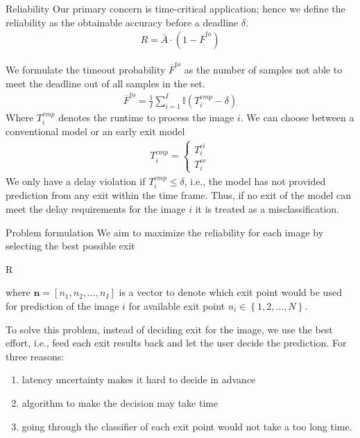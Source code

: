\begin{enumdescript}
\begin{enumdescript}
	\end{enumdescript}
	
	\item[Reliability] Our primary concern is time-critical application; hence we define the reliability as the obtainable accuracy before a deadline $ \delta $. 	
	\begin{align}
	R= \bar{A} \cdot (1-\overline{F}^{to})
	\end{align}
	
	We formulate the timeout probability $ \overline{F}^{to} $ as the number of samples not able to meet the deadline out of all samples in the set.
	\begin{align}
	\overline{F}^{to}=\frac{1}{I}\sum_{i=1}^{I} \mathbb{I}\left(T_{i}^{cmp}-\delta\right)
	\end{align}
	Where $ T_{i}^{cmp} $ denotes the runtime to process the image $i$. We can choose between a conventional model or an early exit model 
	\begin{align}
	T^{cmp}_i = \begin{cases}
	T^{ci}_i \\
	T^{ee}_i
	\end{cases} \label{eq:t_ci-and-t_ee}
	\end{align}
	We only have a delay violation if $ T_i^{cmp} \leq \delta $, i.e., the model has not provided prediction from any exit within the time frame. Thus, if no exit of the model can meet the delay requirements for the image $i$ it is treated as a misclassification. 
	
	\item[Problem formulation] We aim to maximize the reliability for each image by selecting the best possible exit
	\begin{maxi}
		{}{R}
		{}{}
	\end{maxi}
	where $ \bm{n} = \left[ n_1, n_2, \dots, n_I \right]$ is a vector to denote which exit point would be used for prediction of the image $ i $ for available exit point $ n_i \in \left\{1,2, \dots, N\right\} $.
	
	To solve this problem, instead of deciding exit for the image, we use the best effort, i.e., feed each exit results back and let the user decide the prediction. For three reasons:
	\begin{enumerate}
		\item latency uncertainty makes it hard to decide in advance
		\item algorithm to make the decision may take time
		\item going through the classifier of each exit point would not take a too long time.
	\end{enumerate}
	
\end{enumdescript}

